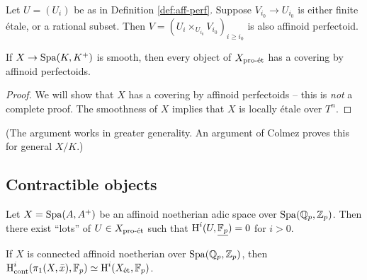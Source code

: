 \begin{lemma}
Let $U=(U_i)$ be as in Definition \ref{def:aff-perf}. Suppose 
$V_{i_0} \to U_{i_0}$ is either finite \'etale, or a rational subset. Then 
$V=(U_i\times_{U_{i_0}} V_{i_0})_{i\geqslant i_0}$ is also affinoid 
perfectoid. 
\end{lemma}

\begin{corollary}
If $X\to \operatorname{Spa}(K,K^+)$ is smooth, then every object of 
$X_{\textnormal{pro-\'et}}$ has a covering by affinoid perfectoids. 
\end{corollary}
\begin{proof}
We will show that $X$ has a covering by affinoid perfectoids -- this is \emph{not} 
a complete proof. The smoothness of $X$ implies that $X$ is locally \'etale over 
$T^n$. 
\end{proof}

(The argument works in greater generality. An argument of Colmez proves this 
for general $X/K$.) 





\subsection{Contractible objects}

Let $X=\operatorname{Spa}(A,A^+)$ be an affinoid noetherian adic space over $\operatorname{Spa}(\mathbb{Q}_p,\mathbb{Z}_p)$. 
Then there exist ``lots'' of $U\in X_{\textnormal{pro-\'et}}$ such that 
$\operatorname{H}^i(U,\underline{\mathbb{F}_p})=0$ for $i>0$. 

If $X$ is connected affinoid noetherian over $\operatorname{Spa}(\mathbb{Q}_p,\mathbb{Z}_p)$, then 
$\operatorname{H}^i_\text{cont}(\pi_1(X,\bar x),\mathbb{F}_p)\simeq \operatorname{H}^i(X_{\textnormal{\'et}},\mathbb{F}_p)$. 



